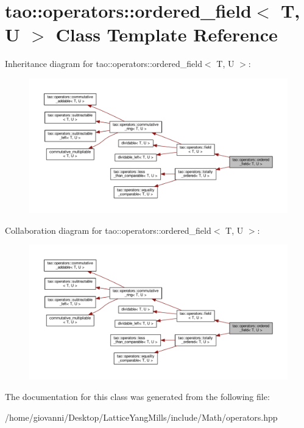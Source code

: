 \hypertarget{classtao_1_1operators_1_1ordered__field}{}\section{tao\+:\+:operators\+:\+:ordered\+\_\+field$<$ T, U $>$ Class Template Reference}
\label{classtao_1_1operators_1_1ordered__field}


Inheritance diagram for tao\+:\+:operators\+:\+:ordered\+\_\+field$<$ T, U $>$\+:\nopagebreak
\begin{figure}[H]
\begin{center}
\leavevmode
\includegraphics[width=350pt]{classtao_1_1operators_1_1ordered__field__inherit__graph}
\end{center}
\end{figure}


Collaboration diagram for tao\+:\+:operators\+:\+:ordered\+\_\+field$<$ T, U $>$\+:\nopagebreak
\begin{figure}[H]
\begin{center}
\leavevmode
\includegraphics[width=350pt]{classtao_1_1operators_1_1ordered__field__coll__graph}
\end{center}
\end{figure}


The documentation for this class was generated from the following file\+:\begin{DoxyCompactItemize}
\item 
/home/giovanni/\+Desktop/\+Lattice\+Yang\+Mills/include/\+Math/operators.\+hpp\end{DoxyCompactItemize}

